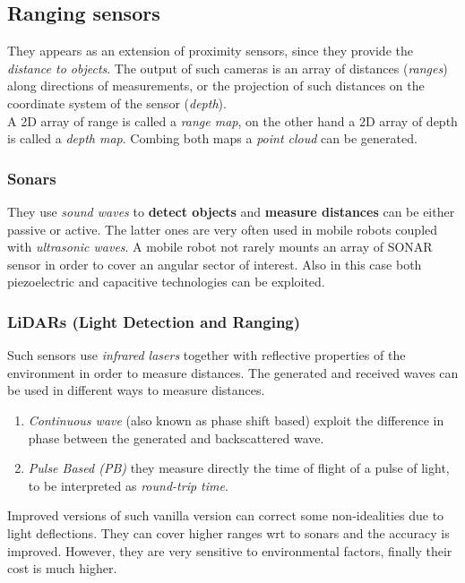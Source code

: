 \subsection{Ranging sensors}
They appears as an extension of proximity sensors, since they provide the \textit{distance to objects}. The output of such cameras is an  array of distances (\textit{ranges}) along directions of measurements, or the projection of such distances on the coordinate system of the sensor (\textit{depth}).\\
A 2D array of range is called a \textit{range map}, on the other hand a 2D array of depth is  called a \textit{depth map}. Combing both maps a \textit{point cloud} can be generated. 

\subsubsection{Sonars}
They use \textit{sound waves} to \textbf{detect objects} and \textbf{measure distances} can be either passive or active. The latter ones are very often used in mobile robots coupled with \textit{ultrasonic waves}. A mobile robot not rarely mounts an array of SONAR sensor in order to cover an angular sector of interest. Also in this  case  both piezoelectric and capacitive technologies can be exploited.


\subsubsection{LiDARs (Light Detection and Ranging)}
Such sensors use \textit{infrared lasers} together with reflective properties of the environment in order to measure distances. The generated and received waves can be used in different ways to measure distances.
\begin{enumerate}
    \itemsep-0.3em
    \item \textit{Continuous wave} (also known as phase shift based) exploit the difference in phase between the generated and backscattered wave.
    \item \textit{Pulse Based (PB)} they measure directly the time of flight of a pulse of light, to be interpreted as \textit{round-trip time}.
 \end{enumerate}
 Improved versions of such vanilla version can correct some non-idealities due to light deflections. They can cover higher ranges wrt to sonars and the accuracy is improved. However, they are very sensitive to environmental factors, finally their cost is much higher.

